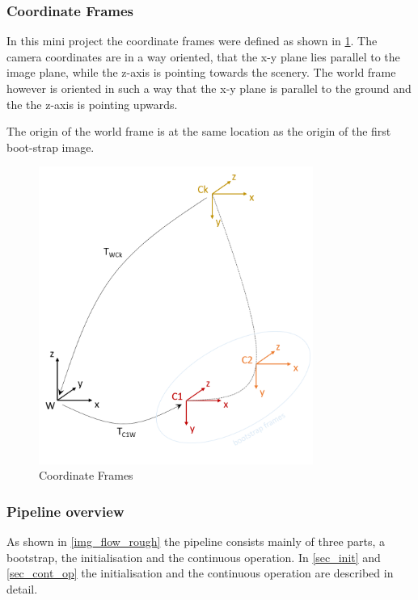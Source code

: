 \documentclass[a4paper,10pt]{article} %
\begin{document}
\subsubsection{Coordinate Frames}
In this mini project the coordinate frames were defined as shown in \cref{img_coord_frames}. The camera coordinates are in a way oriented, that the x-y plane lies parallel to the image plane, while the z-axis is pointing towards the scenery. The world frame however is oriented in such a way that the x-y plane is parallel to the ground and the the z-axis is pointing upwards.

The origin of the world frame is at the same location as the origin of the first boot-strap image.

\begin{figure}[ht]
	\includegraphics[width=0.8\textwidth]{coord_frames}
	\caption{Coordinate Frames}
	\label{img_coord_frames}
\end{figure}




\subsubsection{Pipeline overview}

As shown in \cref{img_flow_rough} the pipeline consists mainly of three parts, a bootstrap, the initialisation and the continuous operation. In \cref{sec_init} and \cref{sec_cont_op} the initialisation and the continuous operation are described in detail.
\end{document}
